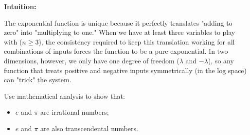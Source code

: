 \begin{solution}
\textbf{Intuition:}

The exponential function is unique because it perfectly translates "adding to zero" into "multiplying to one." When we have at least three variables to play with ($n \geq 3$), the consistency required to keep this translation working for all combinations of inputs forces the function to be a pure exponential. In two dimensions, however, we only have one degree of freedom ($\lambda$ and $-\lambda$), so any function that treats positive and negative inputs symmetrically (in the log space) can "trick" the system.


\end{solution}

\vspace{2em}

\begin{exercise}
\label{analysis:2011:12}
Use mathematical analysis to show that:
\begin{itemize}
\item[a)] $e$ and $\pi$ are irrational numbers;
\item[b)] $e$ and $\pi$ are also transcendental numbers.
\end{itemize}
\end{exercise}

